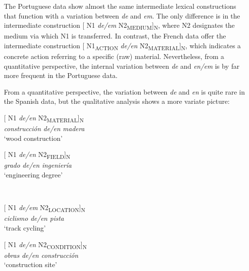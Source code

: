 \documentclass[output=paper]{langsci/langscibook}
\begin{document}
The Portuguese data show almost the same intermediate lexical constructions that function with a variation between \textit{de} and \textit{em}. The only difference is in the intermediate construction [ N1 \textit{de/em} N2\textsubscript{MEDIUM}]\textsubscript{N}, where N2 designates the medium via which N1 is transferred. In contrast, the French data offer the intermediate construction [ N1\textsubscript{ACTION} \textit{de/en} N2\textsubscript{MATERIAL}]\textsubscript{N}, which indicates a concrete action referring to a specific (raw) material. Nevertheless, from a quantitative perspective, the internal variation between \textit{de} and \textit{en/em} is by far more frequent in the Portuguese data.

 From a quantitative perspective, the variation between \textit{de} and \textit{en} is quite rare in the Spanish data, but the qualitative analysis shows a more variate picture:


\begin{minipage}{0.4\textwidth}    %
[ N1 \textit{de/en} N2\textsubscript{MATERIAL}]\textsubscript{N}\\
\textit{construcción de/en madera }\\
`wood construction'
\end{minipage}
\hfill            %
\begin{minipage}{0.4\textwidth}
[ N1 \textit{de/en} N2\textsubscript{FIELD}]\textsubscript{N}\\
\textit{grado de/en ingeniería}\\
`engineering degree'
\end{minipage} \\
\hfill  
\vspace{0.5cm}

\begin{minipage}{0.4\textwidth}    %
[ N1 \textit{de/em} N2\textsubscript{LOCATION}]\textsubscript{N}\\
\textit{ciclismo de/en pista}\\
`track cycling'
\end{minipage}
\hfill            %
\begin{minipage}{0.4\textwidth}
[ N1 \textit{de/en} N2\textsubscript{CONDITION}]\textsubscript{N}\\
\textit{obras de/en construcción}\\
`construction site'
\end{minipage} \\
\hfill
\vspace{0.5cm}
\end{document}
